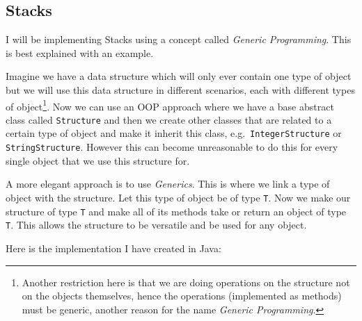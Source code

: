 \documentclass[../../../../../main.tex]{subfiles}
\begin{document}
\subsection{Stacks}
I will be implementing Stacks using a concept called \textit{Generic Programming\cite{generics}}. This is best explained with an example.

Imagine we have a data structure which will only ever contain one type of object but we will use this data structure in different scenarios, each with different types of object\footnote{Another restriction here is that we are doing operations on the structure not on the objects themselves, hence the operations (implemented as methods) must be generic, another reason for the name \textit{Generic Programming\cite{generics}}.}.
 Now we can use an OOP approach where we have a base abstract class called \texttt{Structure} and then we create other classes that are related to a certain type of object and make it inherit this class, e.g.\ \texttt{IntegerStructure} or \texttt{StringStructure}. However this can become unreasonable to do this for every single object that we use this structure for.
 
 A more elegant approach is to use \textit{Generics}. This is where we link a type of object with the structure. Let this type of object be of type \texttt{T}. Now we make our structure of type \texttt{T} and make all of its methods take or return an object of type \texttt{T}. This allows the structure to be versatile and be used for any object.

Here is the implementation I have created in Java:
\end{document}
